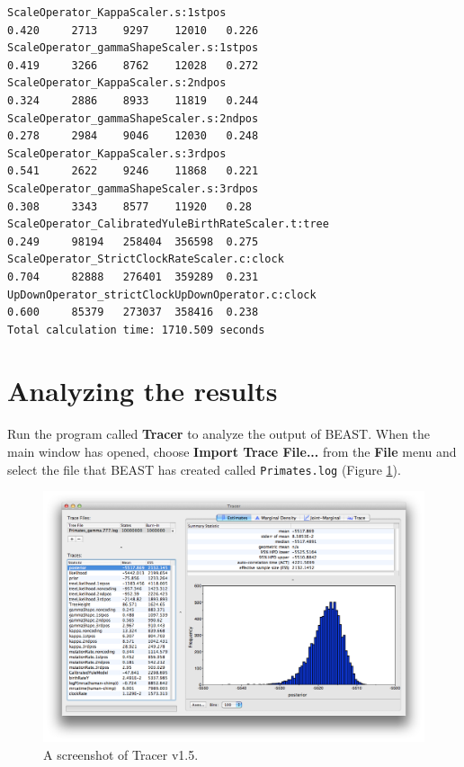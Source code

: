 \documentclass[11pt]{article}
\newcommand{\TracerVersion}{1.5}
\theoremstyle{plain}%
\theoremstyle{definition}
\theoremstyle{remark}
\begin{document}
{\begin{verbatim}
ScaleOperator_KappaScaler.s:1stpos                                    0.420 	2713	9297	12010	0.226 
ScaleOperator_gammaShapeScaler.s:1stpos                               0.419 	3266	8762	12028	0.272 
ScaleOperator_KappaScaler.s:2ndpos                                    0.324 	2886	8933	11819	0.244 
ScaleOperator_gammaShapeScaler.s:2ndpos                               0.278 	2984	9046	12030	0.248 
ScaleOperator_KappaScaler.s:3rdpos                                    0.541 	2622	9246	11868	0.221 
ScaleOperator_gammaShapeScaler.s:3rdpos                               0.308 	3343	8577	11920	0.28 
ScaleOperator_CalibratedYuleBirthRateScaler.t:tree                    0.249 	98194	258404	356598	0.275 
ScaleOperator_StrictClockRateScaler.c:clock                           0.704 	82888	276401	359289	0.231 
UpDownOperator_strictClockUpDownOperator.c:clock                      0.600 	85379	273037	358416	0.238 
Total calculation time: 1710.509 seconds
\end{verbatim}}

\section{Analyzing the results}

Run the program called {\bf Tracer} to analyze the output of BEAST. When the main
window has opened, choose {\bf Import Trace File...} from the {\bf File} menu and select the file that
BEAST has created called \texttt{Primates.log} (Figure \ref{fig:Tracer1}).

\begin{figure}
\includegraphics[width=\textwidth]{figures/Tracer1}
\caption{A screenshot of Tracer v{\TracerVersion}.}
\label{fig:Tracer1}
\end{figure}
\end{document}
